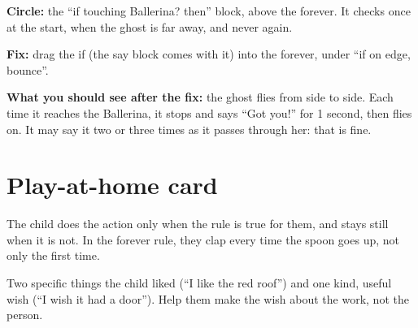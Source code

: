 \begin{answer}
\textbf{Circle:} the \enquote{if touching Ballerina? then} block, above the forever. It checks once at the start, when the ghost is far away, and never again.

\textbf{Fix:} drag the if (the say block comes with it) into the forever, under \enquote{if on edge, bounce}.

\textbf{What you should see after the fix:} the ghost flies from side to side. Each time it reaches the Ballerina, it stops and says \enquote{Got you!} for 1 second, then flies on. It may say it two or three times as it passes through her: that is fine.
\end{answer}

\section{Play-at-home card}
\begin{answer}
The child does the action only when the rule is true for them, and stays still when it is not. In the forever rule, they clap every time the spoon goes up, not only the first time.
\end{answer}

\begin{answer}
Two specific things the child liked (\enquote{I like the red roof}) and one kind, useful wish (\enquote{I wish it had a door}). Help them make the wish about the work, not the person.
\end{answer}

